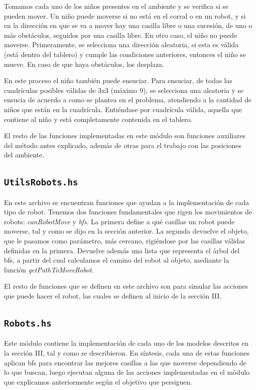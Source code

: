 \documentclass[twoside]{article}
\begin{document}
Tomamos cada uno de los ni\~nos presentes en el ambiente y se verifica si se pueden mover. Un ni\~no puede moverse si no est\'a en el corral o en un robot, y si en la direcci\'on en que se va a mover hay una casilla libre o una sucesi\'on, de uno o m\'as obst\'aculos, seguidos por una casilla libre. En otro caso, el ni\~no no puede moverse. Primeramente, se selecciona una direcci\'on aleatoria, si esta es v\'alida (est\'a dentro del tablero) y cumple las condiciones anteriores, entonces el ni\~no se mueve. En caso de que haya obst\'aculos, los desplaza.

En este proceso el ni\~no tambi\'en puede ensuciar. Para ensuciar, de todas las cuadr\'iculas posibles v\'alidas de 3x3 (m\'aximo 9), se selecciona una aleatoria y se ensucia de acuerdo a como se plantea en el problema, atendiendo a la cantidad de ni\~nos que est\'an en la cuadr\'icula. Enti\'endase por cuadr\'icula v\'alida, aquella que contiene al ni\~no y est\'a completamente contenida en el tablero.

El resto de las funciones implementadas en este m\'odulo son funciones auxiliares del m\'etodo antes explicado, adem\'as de otras para el trabajo con las posiciones del ambiente.

\subsection{\texttt{UtilsRobots.hs}}
En este archivo se encuentran funciones que ayudan a la implementaci\'on de cada tipo de robot. Tenemos dos funciones fundamentales que rigen los movimientos de robots: \textit{canRobotMove} y \textit{bfs}. La primera define a qu\'e casillas un robot puede moverse, tal y como se dijo en la secci\'on anterior. La segunda devuelve el objeto, que le pasamos como par\'ametro, m\'as cercano, rigi\'endose por las casillas v\'alidas definidas en la primera. Devuelve adem\'as una lista que representa el \'arbol del bfs, a partir del cual calculamos el camino del robot al objeto, mediante la funci\'on \textit{getPathToMoveRobot}.

El resto de funciones que se definen en este archivo son para simular las acciones que puede hacer el robot, las cuales se definen al inicio de la secci\'on III.

\subsection{\texttt{Robots.hs}}
Este m\'odulo contiene la implementaci\'on de cada uno de los modelos descritos en la secci\'on III, tal y como se describieron. En s\'intesis, cada una de estas funciones aplican bfs para encontrar las mejores casillas a las que moverse dependiendo de lo que buscan, luego ejecutan alguna de las acciones implementadas en el m\'odulo que explicamos anteriormente seg\'un el objetivo que persiguen.
\end{document}
